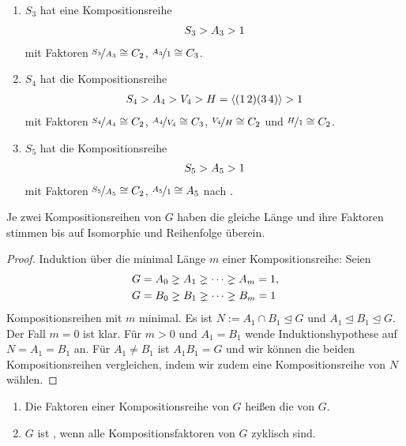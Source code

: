 \begin{example}
	\begin{enumerate}[label=(\alph*)]
		\item $S_3$ hat eine Kompositionsreihe
		\begin{align}
			S_3 > A_3 > 1 \notag %
		\end{align}
		mit Faktoren $\nicefrac{S_3}{A_3} \cong C_2$, $\nicefrac{A_3}{1} \cong C_3$.
		\item $S_4$ hat die Kompositionsreihe
		\begin{align}
			S_4 > A_4 > V_4 > H=\langle (1\, 2)(3\, 4)\rangle > 1 \notag %
		\end{align}
		mit Faktoren $\nicefrac{S_4}{A_4} \cong C_2$, $\nicefrac{A_4}{V_4} \cong C_3$, $\nicefrac{V_4}{H} \cong C_2$ und $\nicefrac{H}{1}\cong C_2$.
		\item $S_5$ hat die Kompositionsreihe
		\begin{align}
			S_5 > A_5 > 1\notag %
		\end{align}
		mit Faktoren $\nicefrac{S_5}{A_5} \cong C_2$, $\nicefrac{A_5}{1} \cong A_5$ nach .
	\end{enumerate}
\end{example}

\begin{theorem}
	Je zwei Kompositionsreihen von $G$ haben die gleiche Länge und ihre Faktoren stimmen bis auf Isomorphie und Reihenfolge überein.
\end{theorem}

\begin{proof}
	 Induktion über die minimal Länge $m$ einer Kompositionsreihe: Seien
	 \begin{align}
	 	G &= A_0 \gneq A_1 \gneq \dotsm \gneq A_m = 1,\notag \\ %
	 	G &= B_0 \gneq B_1 \gneq \dotsm \gneq B_m = 1\notag
	 \end{align}
	 Kompositionsreihen mit $m$ minimal. Es ist $N := A_1 \cap B_1 \unlhd G$ und $A_1 \unlhd B_1 \unlhd G$. Der Fall $m = 0$ ist klar. Für $m > 0$ und $A_1 = B_1$ wende Induktionshypothese auf $N = A_1 = B_1$ an.
	 Für $A_1 \neq B_1$ ist $A_1 B_1 = G$ und wir können die beiden Kompositionsreihen vergleichen, indem wir zudem eine Kompositionsreihe von $N$ wählen.
\end{proof}

\begin{definition}
	\begin{enumerate}[label=(\alph*)]
		\item Die Faktoren einer Kompositionsreihe von $G$ heißen die  von $G$.
		\item $G$ ist , wenn alle Kompositionsfaktoren von $G$ zyklisch sind.
	\end{enumerate}
\end{definition}

